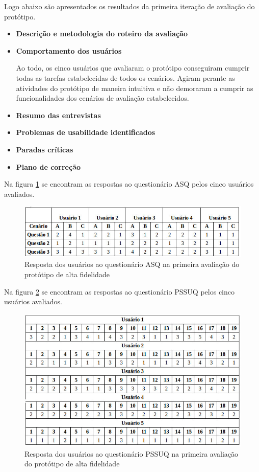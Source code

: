         Logo abaixo são apresentados os resultados da primeira iteração de avaliação do protótipo.
      
      \begin{itemize}
       \item \textbf{Descrição e metodologia do roteiro da avaliação}
       
       \item \textbf{Comportamento dos usuários}
       
       Ao todo, os cinco usuários que avaliaram o protótipo conseguiram cumprir todas as tarefas estabelecidas 
       de todos os cenários. Agiram perante as atividades do protótipo de maneira intuitiva e não demoraram a 
       cumprir as funcionalidades dos cenários de avaliação estabelecidos.
       
       \item \textbf{Resumo das entrevistas}
       
       \item \textbf{Problemas de usabilidade identificados}
       
       \item \textbf{Paradas críticas}
       
       \item \textbf{Plano de correção}
      \end{itemize}
      
      Na figura \ref{asqalta} se encontram as respostas ao questionário ASQ pelos cinco usuários avaliados.
      
  \begin{figure}[!htb]
  \centering
  \includegraphics[scale=0.6]{figuras/asqalta.jpg}
  \caption{Resposta dos usuários ao questionário ASQ na primeira avaliação do protótipo de alta fidelidade}
  \label{asqalta}
  \end{figure}
      
      Na figura \ref{pssuqalta} se encontram as respostas ao questionário PSSUQ pelos cinco usuários avaliados.
      
  \begin{figure}[!htb]
  \centering
  \includegraphics[scale=0.6]{figuras/pssuqalta.jpg}
  \caption{Resposta dos usuários ao questionário PSSUQ na primeira avaliação do protótipo de alta fidelidade}
  \label{pssuqalta}
  \end{figure}